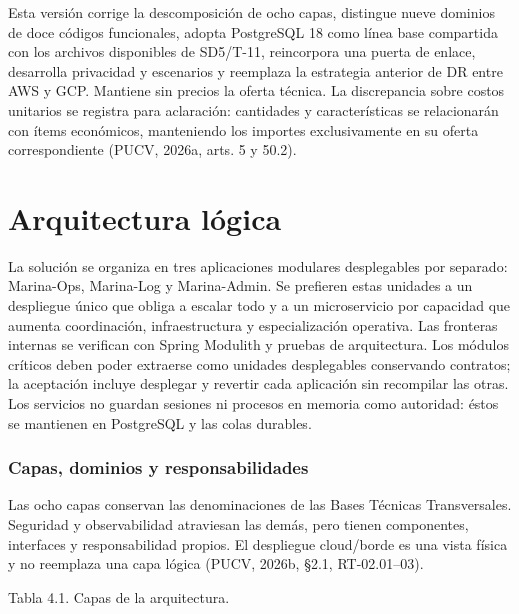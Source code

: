 \documentclass[11pt,letterpaper]{report}
\begin{document}
Esta versión corrige la descomposición de ocho capas, distingue nueve dominios de doce códigos funcionales, adopta PostgreSQL 18 como línea base compartida con los archivos disponibles de SD5/T-11, reincorpora una puerta de enlace, desarrolla privacidad y escenarios y reemplaza la estrategia anterior de DR entre AWS y GCP. Mantiene sin precios la oferta técnica. La discrepancia sobre costos unitarios se registra para aclaración: cantidades y características se relacionarán con ítems económicos, manteniendo los importes exclusivamente en su oferta correspondiente (PUCV, 2026a, arts. 5 y 50.2).

\section{Arquitectura lógica}
La solución se organiza en tres aplicaciones modulares desplegables por separado: Marina-Ops, Marina-Log y Marina-Admin. Se prefieren estas unidades a un despliegue único que obliga a escalar todo y a un microservicio por capacidad que aumenta coordinación, infraestructura y especialización operativa. Las fronteras internas se verifican con Spring Modulith y pruebas de arquitectura. Los módulos críticos deben poder extraerse como unidades desplegables conservando contratos; la aceptación incluye desplegar y revertir cada aplicación sin recompilar las otras. Los servicios no guardan sesiones ni procesos en memoria como autoridad: éstos se mantienen en PostgreSQL y las colas durables.

\subsubsection*{Capas, dominios y responsabilidades}
Las ocho capas conservan las denominaciones de las Bases Técnicas Transversales. Seguridad y observabilidad atraviesan las demás, pero tienen componentes, interfaces y responsabilidad propios. El despliegue cloud/borde es una vista física y no reemplaza una capa lógica (PUCV, 2026b, §2.1, RT-02.01--03).

Tabla 4.1. Capas de la arquitectura.
\end{document}
